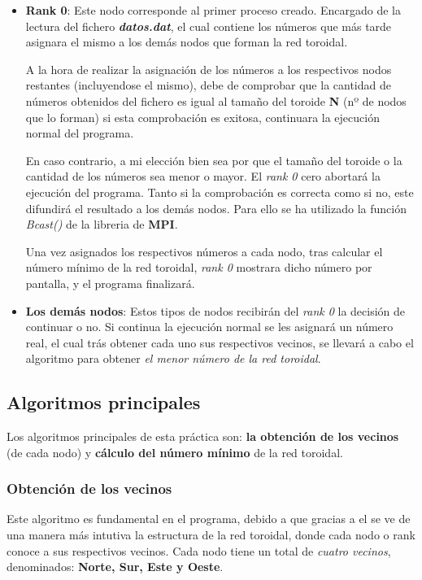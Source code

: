 \documentclass[11pt]{article}
\begin{document}
\begin{itemize}
	\item \textbf{Rank 0}: Este nodo corresponde al primer proceso creado. Encargado de la lectura del fichero \textit{\textbf{datos.dat}}, el cual contiene los números que más tarde asignara el mismo a los demás nodos que forman la red toroidal.
	
	A la hora de realizar la asignación de los números a los respectivos nodos restantes (incluyendose el mismo), debe de comprobar que la cantidad de números obtenidos del fichero es igual al tamaño del toroide \textbf{N} (nº de nodos que lo forman) si esta comprobación es exitosa, continuara la ejecución normal del programa.
	
	En caso contrario, a mi elección bien sea por que el tamaño del toroide o la cantidad de los números sea menor o mayor. El \textit{rank 0} cero abortará la ejecución del programa. 
	Tanto si la comprobación es correcta como si no, este difundirá el resultado a los demás nodos. Para ello se ha utilizado la función \textit{Bcast()} de la libreria de \textbf{MPI}.
	
	Una vez asignados los respectivos números a cada nodo, tras calcular el número mínimo de la red toroidal, \textit{rank 0} mostrara dicho número por pantalla, y el programa finalizará.
	
	\item \textbf{Los demás nodos}: Estos tipos de nodos recibirán del \textit{rank 0} la decisión de continuar o no. Si continua la ejecución normal se les asignará un número real, el cual trás obtener cada uno sus respectivos vecinos, se  llevará a cabo el algoritmo para obtener \textit{el menor número de la red toroidal}.
\end{itemize}


\subsection{Algoritmos principales}
Los algoritmos principales de esta práctica son: \textbf{la obtención de los vecinos} (de cada nodo) y \textbf{cálculo del número mínimo} de la red toroidal.

\subsubsection{Obtención de los vecinos}
Este algoritmo es fundamental en el programa, debido a que gracias a el se ve de una manera más intutiva la estructura de la red toroidal, donde cada nodo o rank conoce a sus respectivos vecinos. Cada nodo tiene un total de \textit{cuatro vecinos}, denominados: \textbf{Norte, Sur, Este y Oeste}.
\end{document}
